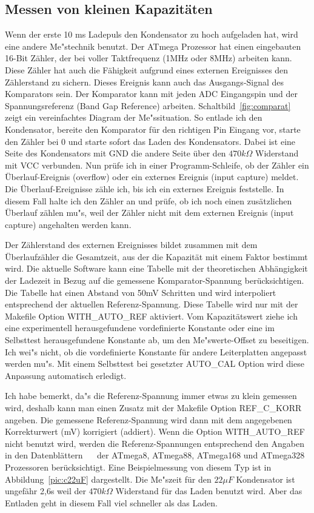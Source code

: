 \subsection{Messen von kleinen Kapazit\"aten}
Wenn der erste 10 ms Ladepuls den Kondensator zu hoch aufgeladen hat, wird eine andere Me"stechnik benutzt.
Der ATmega Prozessor hat einen eingebauten 16-Bit Z\"ahler, der bei voller Taktfrequenz (1MHz oder 8MHz) arbeiten kann.
Diese Z\"ahler hat auch die F\"ahigkeit aufgrund eines externen Ereignisses den Z\"ahlerstand zu sichern.
Dieses Ereignis kann auch das Ausgangs-Signal des Komparators sein.
Der Komparator kann mit jeden ADC Eingangspin und der Spannungsreferenz (Band Gap Reference) arbeiten.
Schaltbild~\ref{fig:comparat} zeigt ein vereinfachtes Diagram der Me"ssituation.
So entlade ich den Kondensator, bereite den Komparator f\"ur den richtigen Pin Eingang vor, starte den Z\"ahler bei 0 und
starte sofort das Laden des Kondensators.
Dabei ist eine Seite des Kondensators mit GND die andere Seite \"uber den \(470k\Omega\) Widerstand mit VCC verbunden.
Nun pr\"ufe ich in einer Programm-Schleife, ob der Z\"ahler ein \"Uberlauf-Ereignis (overflow) oder ein
 externes Ereignis (input capture) meldet.
Die \"Uberlauf-Ereignisse z\"ahle ich, bis ich ein externes Ereignis feststelle.
In diesem Fall halte ich den Z\"ahler an und pr\"ufe, ob ich noch einen zus\"atzlichen \"Uberlauf z\"ahlen mu"s, 
weil der Z\"ahler nicht mit dem externen Ereignis (input capture) angehalten werden kann.


Der Z\"ahlerstand des externen Ereignisses bildet zusammen mit dem \"Uberlaufz\"ahler die Gesamtzeit, aus der die
Kapazit\"at mit einem Faktor bestimmt wird.
Die aktuelle Software kann eine Tabelle mit der theoretischen Abh\"angigkeit der Ladezeit in Bezug auf die gemessene
Komparator-Spannung ber\"ucksichtigen.
Die Tabelle hat einen Abstand von 50mV Schritten und wird interpoliert entsprechend der aktuellen Referenz-Spannung.
Diese Tabelle wird nur mit der Makefile Option WITH\_AUTO\_REF aktiviert.
Vom Kapazit\"atswert ziehe ich eine experimentell herausgefundene vordefinierte Konstante oder eine im Selbsttest
herausgefundene Konstante ab, um den Me"swerte-Offset zu beseitigen.
Ich wei"s nicht, ob die vordefinierte Konstante f\"ur andere Leiterplatten angepasst werden mu"s.
Mit einem Selbsttest bei gesetzter AUTO\_CAL Option wird diese Anpassung automatisch erledigt.

Ich habe bemerkt, da"s die Referenz-Spannung immer etwas zu klein gemessen wird,
 deshalb kann man einen Zusatz mit der Makefile Option REF\_C\_KORR angeben.
Die gemessene Referenz-Spannung wird dann mit dem angegebenen Korrekturwert (mV) korrigiert (addiert).
Wenn die Option WITH\_AUTO\_REF nicht benutzt wird, werden die Referenz-Spannungen entsprechend den Angaben in den
Datenbl\"attern ~\cite{ATmega8}~\cite{ATmega168} der ATmega8, ATmega88, ATmega168 und ATmega328 Prozessoren ber\"ucksichtigt.
Eine Beispielmessung von diesem Typ ist in Abbildung~\ref{pic:c22uF} dargestellt.
Die Me"szeit f\"ur den \(22 \mu F\) Kondensator ist ungef\"ahr 2,6s weil der \(470k\Omega\) Widerstand f\"ur das Laden benutzt wird.
Aber das Entladen geht in diesem Fall viel schneller als das Laden.

